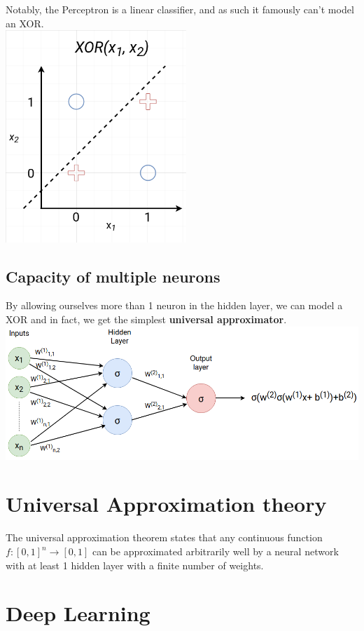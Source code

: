 \documentclass[12pt]{article}
\begin{document}
Notably, the Perceptron is a linear classifier, and as such it famously can’t model an XOR. \\
{\includegraphics[height = 8cm]{figures/xor_non_linsep.png}}


\subsection{Capacity of multiple neurons}
By allowing ourselves more than 1 neuron in the hidden layer, we can model a XOR and in fact, we get the simplest \textbf{universal approximator}. \\

\includegraphics[width=\textwidth]{figures/nn.png}

\section{Universal Approximation theory}

The universal approximation theorem states that any continuous function $f :[0,1]^n \xrightarrow{} [0,1]$ can be approximated arbitrarily well by a neural network with at least 1 hidden layer with a finite number of weights.


\section{Deep Learning}
\end{document}
